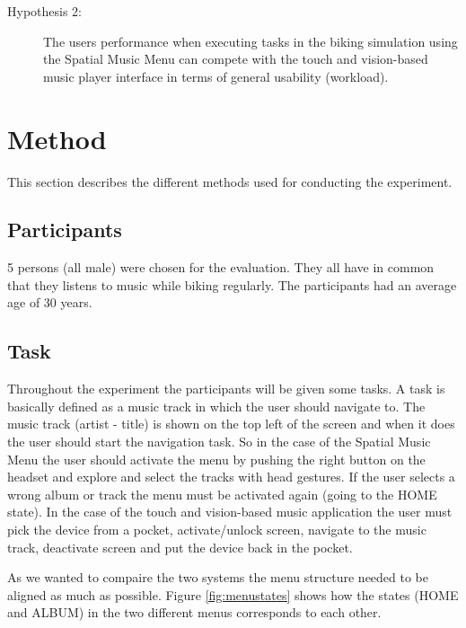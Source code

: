 \begin{description}
\item[Hypothesis 2:] The users performance when executing tasks in the biking simulation using the Spatial Music Menu can compete with the touch and vision-based music player interface in terms of general usability (workload).
\end{description}


\section{Method}
This section describes the different methods used for conducting the experiment.

\subsection{Participants}
5 persons (all male) were chosen for the evaluation. They all have in common that they listens to music while biking regularly. The participants had an average age of 30 years.

\subsection{Task}
Throughout the experiment the participants will be given some tasks. A task is basically defined as a music track in which the user should navigate to. The music track (artist - title) is shown on the top left of the screen and when it does the user should start the navigation task. So in the case of the Spatial Music Menu the user should activate the menu by pushing the right button on the headset and explore and select the tracks with head gestures. If the user selects a wrong album or track the menu must be activated again (going to the HOME state). In the case of the touch and vision-based music application the user must pick the device from a pocket, activate/unlock screen, navigate to the music track, deactivate screen and put the device back in the pocket.

As we wanted to compaire the two systems the menu structure needed to be aligned as much as possible. Figure \ref{fig:menustates} shows how the states (HOME and ALBUM) in the two different menus corresponds to each other.

